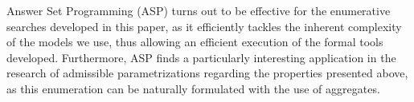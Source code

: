Answer Set Programming (ASP) \cite{Baral03} turns out to be effective for the enumerative searches developed in this paper,
as it efficiently tackles the inherent complexity of the models we use, thus allowing an efficient execution of the formal tools developed.
Furthermore, ASP finds a particularly interesting application in the research of admissible parametrizations regarding the properties presented above, as this enumeration can be naturally formulated with the use of aggregates.
